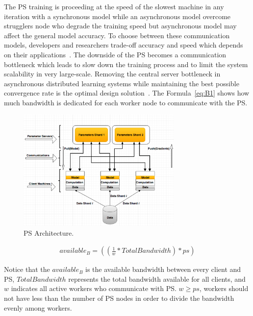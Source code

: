 \documentclass[conference]{IEEEtran}
\begin{document}

The PS training is proceeding at the speed of the slowest machine in any iteration with a synchronous model while an asynchronous model overcome strugglers node who degrade the training speed but  asynchronous model may affect the general model accuracy. To choose between these communication models, developers and researchers trade-off accuracy and speed which depends on their applications~\cite{cui2014exploiting}. The downside of the PS becomes a communication bottleneck which leads to slow down the training process and to limit the system scalability in very large-scale. Removing the central server bottleneck in asynchronous distributed learning systems while maintaining the best possible convergence rate is the optimal design solution~\cite{cui2014exploiting, cui2014big, cheung2002effect, ahmed2012scalable}. The Formula~\ref{eq:B1} shows how much bandwidth is dedicated for each worker node to communicate with the PS.

\begin{figure}[htb]
  \includegraphics[width=3.2in]{Fig/ps}
  \caption{PS Architecture.}
  \label{fig:ps}
\end{figure}

\begin{equation} \label{eq:B1}
\begin{split}
available_{B} =((\frac{1}{w} * {Total Bandwidth}) * ps )
\end{split}
\end{equation}

Notice that the $available_ {B}$ is the available bandwidth between every client and PS, $Total Bandwidth$ represents the total bandwidth available for all clients, and $w$ indicates all active workers who communicate with PS. $w\geq ps$, workers should not have less than the number of PS nodes in order to divide the bandwidth evenly among workers.
\end{document}
